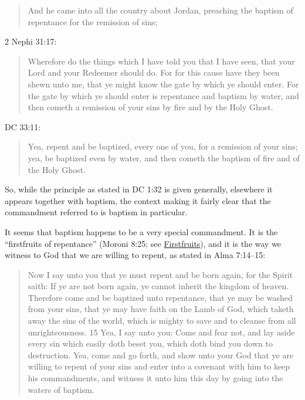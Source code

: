 					\begin{quote}
						And he came into all the country about Jordan, preaching the baptism of repentance for the remission of sins;
					\end{quote}
					
				2 Nephi 31:17:

					\begin{quote}
						Wherefore do the things which I have told you that I have seen, that your Lord and your Redeemer should do. For for this cause have they been shewn unto me, that ye might know the gate by which ye should enter. For the gate by which ye should enter is repentance and baptism by water, and then cometh a remission of your sins by fire and by the Holy Ghost. 
					\end{quote}
					
				DC 33:11:
				
					\begin{quote}
						Yea, repent and be baptized, every one of you, for a remission of your sins; yea, be baptized even by water, and then cometh the baptism of fire and of the Holy Ghost.
					\end{quote}
					
				So, while the principle as stated in DC 1:32 is given generally, elsewhere it appears together with baptism, the context making it fairly clear that the commandment referred to is baptism in particular.
				
				It seems that baptism happens to be a very special commandment. It is the ``firstfruits of repentance'' (Moroni 8:25; see \hyperref[FIRSTFRUITS]{Firstfruits}), and it is the way we witness to God that we are willing to repent, as stated in Alma 7:14--15:
				
					\begin{quote}
						Now I say unto you that ye must repent and be born again, for the Spirit saith: If ye are not born again, ye cannot inherit the kingdom of heaven. Therefore come and be baptized unto repentance, that ye may be washed from your sins, that ye may have faith on the Lamb of God, which taketh away the sins of the world, which is mighty to save and to cleanse from all unrighteousness. 15 Yea, I say unto you: Come and fear not, and lay aside every sin which easily doth beset you, which doth bind you down to destruction. Yea, come and go forth, and show unto your God that ye are willing to repent of your sins and enter into a covenant with him to keep his commandments, and witness it unto him this day by going into the waters of baptism.
					\end{quote}
					
